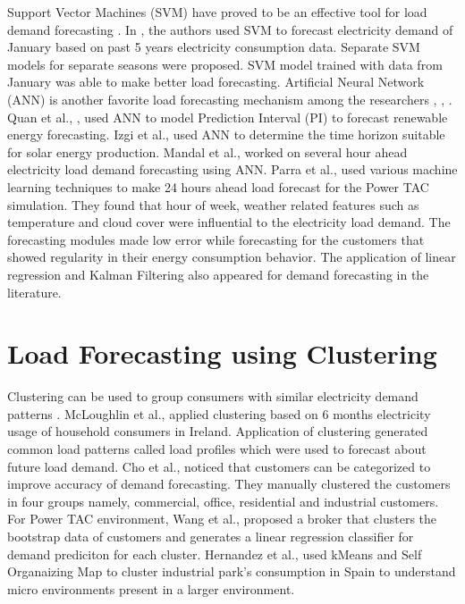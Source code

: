 Support Vector Machines (SVM) have proved to be an effective tool for load demand forecasting \cite{sapankevych2009time, chen2004load}. In \cite{chen2004load}, the authors used SVM to forecast electricity demand of January based on past 5 years electricity consumption data. Separate SVM models for separate seasons were proposed. SVM model trained with data from January was able to make better load forecasting. Artificial Neural Network (ANN) is another favorite load forecasting mechanism among the researchers \cite{izgi2012short}, \cite{quan2014short}, \cite{hsu2003regional}. Quan et al., \cite{quan2014short}, used ANN to model Prediction Interval (PI) to forecast renewable energy forecasting. Izgi et al.,  \cite{izgi2012short} used ANN to determine the time horizon suitable for solar energy production. Mandal et al., \cite{mandal2006neural} worked on several hour ahead electricity load demand forecasting using ANN. Parra \cite{parra2013initial} et al., used various machine learning techniques to make 24 hours ahead load forecast for the Power TAC simulation. They found that hour of week, weather related features such as temperature and cloud cover were influential to the electricity load demand. The forecasting modules made low error while forecasting for the customers that showed regularity in their energy consumption behavior. The application of linear regression \cite{mcloughlin2015clustering, hernandez2012classification} and Kalman Filtering \cite{al2004short} also appeared for demand forecasting in the literature. 

\section {Load Forecasting using Clustering}

Clustering can be used to group consumers with similar electricity demand patterns \cite{hernandez2012classification}. McLoughlin et al., \cite{mcloughlin2015clustering} applied clustering based on 6 months electricity usage of household consumers in Ireland. Application of clustering generated common load patterns called load profiles which were used to forecast about future load demand. Cho \cite{cho1995customer} et al., noticed that customers can be categorized to improve accuracy of demand forecasting. They manually clustered the customers in four groups namely, commercial, office, residential and industrial customers. For Power TAC environment, Wang et al., \cite{wang2015gongbroker} proposed a broker that clusters the bootstrap data of customers and generates a linear regression classifier for demand prediciton for each cluster.  Hernandez et al., \cite{hernandez2012classification} used kMeans and Self Organaizing Map to cluster industrial park's consumption in Spain to understand micro environments present in a larger environment.


